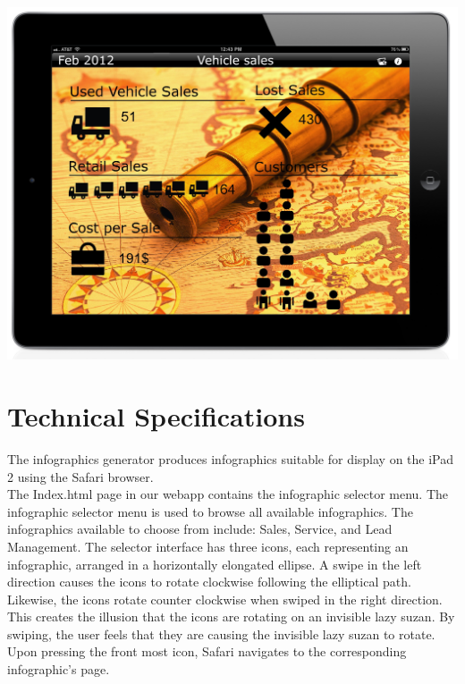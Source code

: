 \documentclass[11pt,a4paper,oneside]{article}
\begin{document}
\includegraphics[width=1\textwidth]{images/screen4.jpg}\\

\section{Technical Specifications}

The infographics generator produces infographics suitable for display on the iPad 2 using the Safari browser.\\

The Index.html page in our webapp contains the infographic selector menu.  The infographic selector menu is used to browse all available infographics.  The infographics available to choose from include: Sales, Service, and Lead Management.  The selector interface has three icons, each representing an infographic, arranged in a horizontally elongated ellipse.  A swipe in the left direction causes the icons to rotate clockwise following the elliptical path.  Likewise, the icons rotate counter clockwise when swiped in the right direction.  This creates the illusion that the icons are rotating on an invisible lazy suzan. By swiping, the user feels that they are causing the invisible lazy suzan to rotate.  Upon pressing the front most icon, Safari navigates to the corresponding infographic's page.\\
\end{document}
